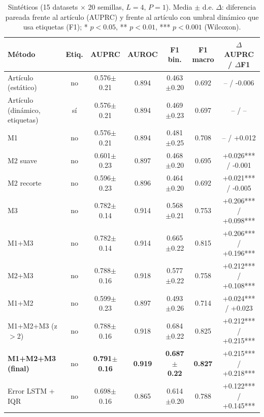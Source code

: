 \begin{table}[t]
\centering\small
\caption{Sintéticos (15 datasets $\times$ 20 semillas, $L{=}4$, $P{=}1$). Media $\pm$ d.e. $\Delta$: diferencia pareada frente al artículo (AUPRC) y frente al artículo con umbral dinámico que usa etiquetas (F1); * $p<0.05$, ** $p<0.01$, *** $p<0.001$ (Wilcoxon).}
\label{tab:synth}
\begin{tabular}{lcccccc}
\toprule
Método & Etiq. & AUPRC & AUROC & F1 bin. & F1 macro & $\Delta$AUPRC / $\Delta$F1 \\
\midrule
Artículo (estático) & no & 0.576{\scriptsize$\pm$0.21} & 0.894 & 0.463{\scriptsize$\pm$0.20} & 0.692 & -- / -0.006 \\
Artículo (dinámico, etiquetas) & sí & 0.576{\scriptsize$\pm$0.21} & 0.894 & 0.469{\scriptsize$\pm$0.23} & 0.697 & -- / -- \\
\midrule
M1 & no & 0.576{\scriptsize$\pm$0.21} & 0.894 & 0.481{\scriptsize$\pm$0.25} & 0.708 & -- / +0.012 \\
M2 suave & no & 0.601{\scriptsize$\pm$0.23} & 0.897 & 0.468{\scriptsize$\pm$0.20} & 0.695 & +0.026*** / -0.001 \\
M2 recorte & no & 0.596{\scriptsize$\pm$0.23} & 0.896 & 0.464{\scriptsize$\pm$0.20} & 0.692 & +0.021*** / -0.005 \\
M3 & no & 0.782{\scriptsize$\pm$0.14} & 0.914 & 0.568{\scriptsize$\pm$0.21} & 0.753 & +0.206*** / +0.098*** \\
M1+M3 & no & 0.782{\scriptsize$\pm$0.14} & 0.914 & 0.665{\scriptsize$\pm$0.22} & 0.815 & +0.206*** / +0.196*** \\
M2+M3 & no & 0.788{\scriptsize$\pm$0.16} & 0.918 & 0.577{\scriptsize$\pm$0.22} & 0.758 & +0.212*** / +0.108*** \\
M1+M2 & no & 0.599{\scriptsize$\pm$0.23} & 0.897 & 0.493{\scriptsize$\pm$0.26} & 0.714 & +0.024*** / +0.023 \\
\midrule
M1+M2+M3 (z$>$2) & no & 0.788{\scriptsize$\pm$0.16} & 0.918 & 0.684{\scriptsize$\pm$0.22} & 0.825 & +0.212*** / +0.215*** \\
\textbf{M1+M2+M3 (final)} & no & \textbf{0.791{\scriptsize$\pm$0.16}} & \textbf{0.919} & \textbf{0.687{\scriptsize$\pm$0.22}} & \textbf{0.827} & +0.215*** / +0.218*** \\
\midrule
Error LSTM + IQR & no & 0.698{\scriptsize$\pm$0.16} & 0.865 & 0.614{\scriptsize$\pm$0.20} & 0.788 & +0.122*** / +0.145*** \\
\bottomrule
\end{tabular}
\end{table}
